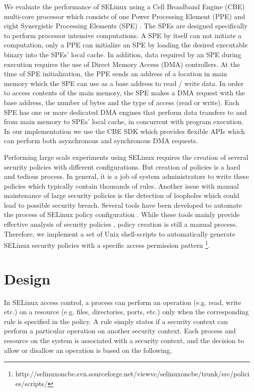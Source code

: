\documentclass[conference]{IEEEtran}
\begin{document}
We evaluate the performance of SELinux using a Cell Broadband Engine (CBE) multi-core processor which consists of one Power Processing
Element (PPE) and eight Synergistic Processing Elements (SPE)
\cite{CBEArch}.  The SPEs are designed specifically to perform
processor intensive computations. A SPE by itself can not initiate a
computation, only a PPE can initialize an SPE by loading the desired
executable binary into the SPEs' local cache. In addition, data
required by an SPE during execution requires the use of Direct Memory
Access (DMA) controllers. At the time of SPE initialization, the PPE
sends an address of a location in main memory which the SPE can use as
a base address to read / write data. In order to access contents of
the main memory, the SPE makes a DMA request with the base address,
the number of bytes and the type of access (read or write). Each SPE
has one or more dedicated DMA engines that perform data transfers to
and from main memory to SPEs' local cache, in concurrent with program
execution. In our implementation we use the CBE SDK which provides
flexible APIs which can perform both asynchronous and synchronous DMA
requests.

Performing large scale experiments using SELinux requires the creation of several security
policies with different configurations. But creation of policies is a
hard and tedious process. In general, it is a job of system
administrators to write these policies which typically contain
thousands of rules. Another issue with manual maintenance of large security
policies is the detection of loopholes which could lead to possible
security breach. Several tools have been developed to automate the
process of SELinux policy configuration \cite{selinuxTools}. While
these tools mainly provide effective analysis of security policies
\cite{selinuxTools}, policy creation is still a manual
process. Therefore, we
implement a set of Unix shell-scripts to
automatically generate SELinux security policies with a specific access permission
pattern
\footnote{http://selinuxoncbe.svn.sourceforge.net/viewvc/selinuxoncbe/trunk/src/policies/scripts/}.


\section{Design}\label{design}

In SELinux access control, a process can perform an operation
(e.g. read, write etc.) on a resource (e.g. files, directories, ports, etc.)
only when the corresponding rule is specified in the policy. A rule
simply states if a security context can perform a particular operation
on another security context. Each process and resource on the system
is associated with a security context, and the decision to allow or
disallow an operation is based on the following,
\end{document}
